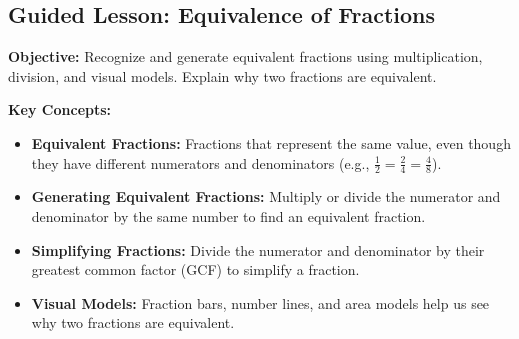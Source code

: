 \documentclass[12pt]{article}
\title{}
\date{}
\begin{document}
\subsection*{Guided Lesson: Equivalence of Fractions}
\onehalfspacing

\begin{tcolorbox}[colframe=black!40, colback=gray!5, 
coltitle=black, colbacktitle=black!20, fonttitle=\bfseries\Large, 
title=Learning Objective, halign title=center, left=5pt, right=5pt, top=5pt, bottom=15pt]
\textbf{Objective:} Recognize and generate equivalent fractions using multiplication, division, and visual models. Explain why two fractions are equivalent. \vspace{1cm}
\end{tcolorbox}

\begin{tcolorbox}[colframe=black!60, colback=white, 
coltitle=black, colbacktitle=black!15, fonttitle=\bfseries\Large, 
title=Key Concepts and Vocabulary, halign title=center, left=10pt, right=10pt, top=10pt, bottom=15pt]
\textbf{Key Concepts:}
\begin{itemize}
    \item \textbf{Equivalent Fractions:} Fractions that represent the same value, even though they have different numerators and denominators (e.g., \( \frac{1}{2} = \frac{2}{4} = \frac{4}{8} \)).
    \item \textbf{Generating Equivalent Fractions:} Multiply or divide the numerator and denominator by the same number to find an equivalent fraction.
    \item \textbf{Simplifying Fractions:} Divide the numerator and denominator by their greatest common factor (GCF) to simplify a fraction.
    \item \textbf{Visual Models:} Fraction bars, number lines, and area models help us see why two fractions are equivalent.
    \vspace{1cm}
\end{itemize}
\end{tcolorbox} 
\end{document}
